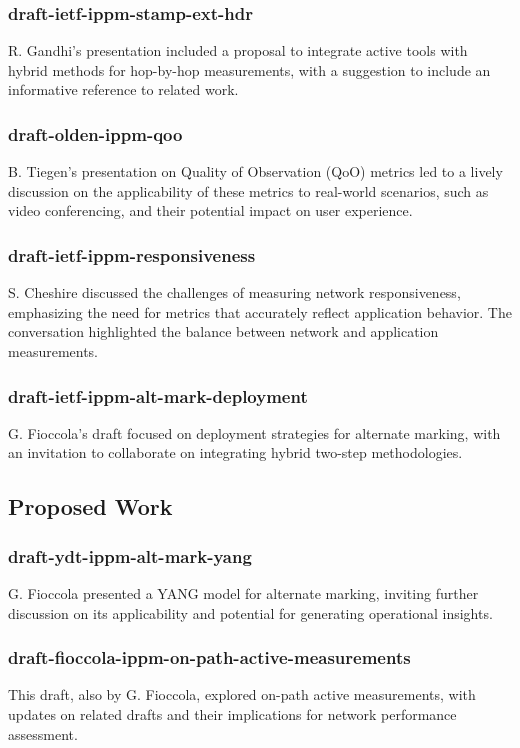 \documentclass{article}
\begin{document}
\subsubsection{draft-ietf-ippm-stamp-ext-hdr}
R. Gandhi's presentation included a proposal to integrate active tools with hybrid methods for hop-by-hop measurements, with a suggestion to include an informative reference to related work.

\subsubsection{draft-olden-ippm-qoo}
B. Tiegen's presentation on Quality of Observation (QoO) metrics led to a lively discussion on the applicability of these metrics to real-world scenarios, such as video conferencing, and their potential impact on user experience.

\subsubsection{draft-ietf-ippm-responsiveness}
S. Cheshire discussed the challenges of measuring network responsiveness, emphasizing the need for metrics that accurately reflect application behavior. The conversation highlighted the balance between network and application measurements.

\subsubsection{draft-ietf-ippm-alt-mark-deployment}
G. Fioccola's draft focused on deployment strategies for alternate marking, with an invitation to collaborate on integrating hybrid two-step methodologies.

\subsection{Proposed Work}

\subsubsection{draft-ydt-ippm-alt-mark-yang}
G. Fioccola presented a YANG model for alternate marking, inviting further discussion on its applicability and potential for generating operational insights.

\subsubsection{draft-fioccola-ippm-on-path-active-measurements}
This draft, also by G. Fioccola, explored on-path active measurements, with updates on related drafts and their implications for network performance assessment.
\end{document}
